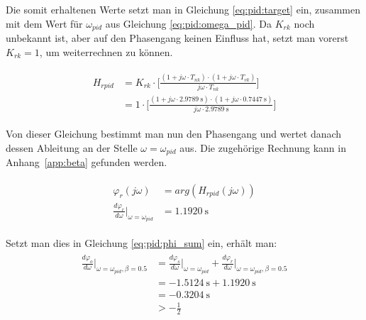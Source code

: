 Die  somit  erhaltenen  Werte   setzt  man  in  Gleichung  \ref{eq:pid:target}
ein,   zusammen   mit   dem    Wert   f\"ur   $\omega_{pid}$   aus   Gleichung
\ref{eq:pid:omega_pid}. Da  $K_{rk}$   noch  unbekannt   ist,  aber   auf  den
Phasengang  keinen  Einfluss   hat,  setzt  man  vorerst  $K_{rk}   =  1$,  um
weiterrechnen zu k\"onnen.

\begin{gather} \label{eq:pid:t_nk_t_vk_initial_results}
    \begin{split}
        H_{rpid} & = K_{rk} \cdot \biggl[ \frac{(1 + j\omega \cdot T_{nk}) \cdot (1 + j\omega \cdot T_{vk}) }{ j\omega \cdot T_{nk} } \biggr] \\
                 & = 1      \cdot \biggl[ \frac{(1 + j\omega \cdot \SI{2.9789}{\second}) \cdot (1 + j\omega \cdot \SI{0.7447}{\second}) }{ j\omega \cdot  \SI{2.9789}{\second}} \biggr]
    \end{split}
\end{gather}

Von dieser Gleichung bestimmt man nun  den Phasengang und wertet danach dessen
Ableitung an der Stelle $\omega = \omega_{pid}$ aus. Die zugeh\"orige Rechnung
kann in Anhang~\ref{app:beta} gefunden werden.

\begin{gather} \label{eq:pid:phi_r_first_iteration}
    \begin{split}
        \varphi_r (j\omega)                                            & = arg(H_{rpid}(j\omega))        \\
        \frac{d\varphi_r}{d\omega} \biggr \rvert_{\omega=\omega_{pid}} & = \SI{1.1920}{\second}
    \end{split}
\end{gather}


Setzt man dies in Gleichung \ref{eq:pid:phi_sum} ein, erh\"alt man:
\begin{gather} \label{eq:pid:phi_sum_result_iteration_one}
    \begin{split}
    \frac{d\varphi_o}{d\omega}       \biggr \rvert_{\omega=\omega_{pid}, \beta=0.5}
        & = \frac{d\varphi_s}{d\omega} \biggr \rvert_{\omega=\omega_{pid}}
        + \frac{d\varphi_r}{d\omega} \biggr \rvert_{\omega=\omega_{pid}, \beta=0.5} \\
        & = \SI{-1.5124}{\second} + \SI{1.1920}{\second} \\
        & = \SI{-0.3204}{\second} \\
        & > -\frac{1}{2}
    \end{split}
\end{gather}

